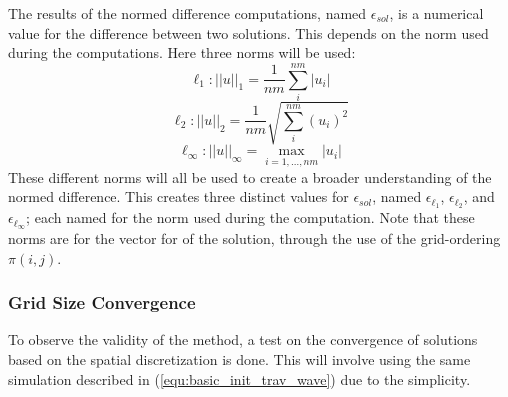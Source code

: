   The results of the normed difference computations, named $\epsilon_{sol}$, is a numerical value for the difference between two solutions.
  This depends on the norm used during the computations.
  Here three norms will be used:
  \begin{equation}  \label{equ:norm_l1}
    \ell_1: ||u||_1 = \frac{1}{nm} \sum_{i}^{nm} |u_{i}|
  \end{equation}
  \begin{equation}  \label{equ:norm_l2}
    \ell_2: ||u||_2 = \frac{1}{nm} \sqrt{\sum_{i}^{nm} (u_{i})^2}
  \end{equation}
  \begin{equation}  \label{equ:norm_linf}
    \ell_\infty: ||u||_\infty = \max_{i=1,\ldots,nm} |u_{i}|
  \end{equation}
  These different norms will all be used to create a broader understanding of the normed difference.
  This creates three distinct values for $\epsilon_{sol}$, named $\epsilon_{\ell_1}$, $\epsilon_{\ell_2}$, and $\epsilon_{\ell_\infty}$; each named for the norm used during the computation.
  Note that these norms are for the vector for of the solution, through the use of the grid-ordering $\pi(i,j)$.
  

\subsubsection{Grid Size Convergence}
  To observe the validity of the method, a test on the convergence of solutions based on the spatial discretization is done.
  This will involve using the same simulation described in (\ref{equ:basic_init_trav_wave}) due to the simplicity. 
 
